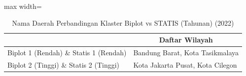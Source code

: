 \begin{table}[H]
\centering
\caption{Nama Daerah Perbandingan Klaster Biplot vs STATIS (Tahunan) (2022)} \label{tab:sample1biplot_statis_comp_name_2022}
\begin{adjustbox}{max width=\textwidth}
\begin{tabular}{|>{\centering\arraybackslash}p{4cm}|p{10cm}|}
\hline
\multicolumn{1}{|c|}{\textbf{Kategori}} & \multicolumn{1}{c|}{\textbf{Daftar Wilayah}} \\
\hline
Biplot 1 (Rendah) \& Statis 1 (Rendah) & Bandung Barat, Kota Tasikmalaya \\
\hline
Biplot 2 (Tinggi) \& Statis 2 (Tinggi) & Kota Jakarta Pusat, Kota Cilegon \\
\hline
\end{tabular}
\end{adjustbox}
\end{table}